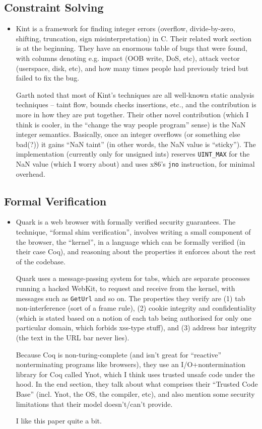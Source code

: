 \documentclass{article}
\begin{document}
\subsection{Constraint Solving}
\begin{itemize}
	\item {\sc Kint} \cite{kint} is a framework for finding integer errors (overflow, divide-by-zero, shifting, truncation, sign misinterpretation) in C. Their related work section is at the beginning. They have an enormous table of bugs that were found, with columns denoting e.g. impact (OOB write, DoS, etc), attack vector (userspace, disk, etc), and how many times people had previously tried but failed to fix the bug.

		Garth noted that most of {\sc Kint}'s techniques are all well-known static analysis techniques -- taint flow, bounds checks insertions, etc., and the contribution is more in how they are put together.
		Their other novel contribution (which I think is cooler, in the ``change the way people program'' sense) is the NaN integer semantics.
		Basically, once an integer overflows (or something else bad(?)) it gains ``NaN taint'' (in other words, the NaN value is ``sticky'').
		The implementation (currently only for unsigned ints) reserves {\tt UINT\_MAX} for the NaN value (which I worry about) and uses x86's {\tt jno} instruction, for minimal overhead.
\end{itemize}

\subsection{Formal Verification}
\begin{itemize}
	\item {\sc Quark} \cite{quark} is a web browser with formally verified security guarantees. The technique, ``formal shim verification'', involves writing a small component of the browser, the ``kernel'', in a language which can be formally verified (in their case Coq), and reasoning about the properties it enforces about the rest of the codebase.

		{\sc Quark} uses a message-passing system for tabs, which are separate processes running a hacked WebKit, to request and receive from the kernel, with messages such as {\tt GetUrl} and so on. The properties they verify are (1) tab non-interference (sort of a frame rule), (2) cookie integrity and confidentiality (which is stated based on a notion of each tab being authorised for only one particular domain, which forbids xss-type stuff), and (3) address bar integrity (the text in the URL bar never lies).

		Because Coq is non-turing-complete (and isn't great for ``reactive'' nonterminating programs like browsers), they use an I/O+nontermination library for Coq called Ynot, which I think uses trusted unsafe code under the hood. In the end section, they talk about what comprises their ``Trusted Code Base'' (incl. Ynot, the OS, the compiler, etc), and also mention some security limitations that their model doesn't/can't provide.

		I like this paper quite a bit.
\end{itemize}
\end{document}
